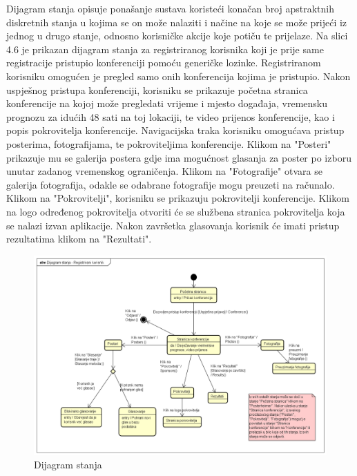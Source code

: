 			\indent Dijagram stanja opisuje ponašanje sustava koristeći konačan broj apstraktnih diskretnih stanja u kojima se on može nalaziti i načine na koje se može prijeći iz jednog u drugo stanje, odnosno korisničke akcije koje potiču te prijelaze. Na slici 4.6 je prikazan dijagram stanja za registriranog korisnika koji je prije same registracije pristupio konferenciji pomoću generičke lozinke. Registriranom korisniku omogućen je pregled samo onih konferencija kojima je pristupio. Nakon uspješnog pristupa konferenciji, korisniku se prikazuje početna stranica konferencije na kojoj može pregledati vrijeme i mjesto događaja, vremensku prognozu za idućih 48 sati na toj lokaciji, te video prijenos konferencije, kao i popis pokrovitelja konferencije. Navigacijska traka korisniku omogućava pristup posterima, fotografijama, te pokroviteljima konferencije. Klikom na "Posteri" prikazuje mu se galerija postera gdje ima mogućnost glasanja za poster po izboru unutar zadanog vremenskog ograničenja. Klikom na "Fotografije" otvara se galerija fotografija, odakle se odabrane fotografije mogu preuzeti na računalo. Klikom na "Pokrovitelji", korisniku se prikazuju pokrovitelji konferencije. Klikom na logo određenog pokrovitelja otvoriti će se službena stranica pokrovitelja koja se nalazi izvan aplikacije. Nakon završetka glasovanja korisnik će imati pristup rezultatima klikom na "Rezultati".
			
			\begin{figure} [hbt!]
				\includegraphics[width=\linewidth]{Slike/StateMachineDiagram}
				\caption{Dijagram stanja}
			\end{figure}
			
			
			\eject 
		
